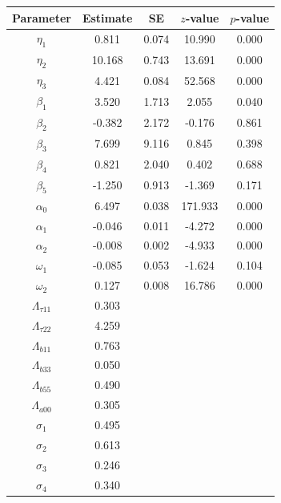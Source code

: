 \begin{table}[ht]
\centering
\begin{tabular}{ccccc}
  \hline
Parameter & Estimate & SE & $z$-value & $p$-value \\ 
  \hline
$\eta_1$ & 0.811 & 0.074 & 10.990 & 0.000 \\ 
  $\eta_2$ & 10.168 & 0.743 & 13.691 & 0.000 \\ 
  $\eta_3$ & 4.421 & 0.084 & 52.568 & 0.000 \\ 
  $\beta_1$ & 3.520 & 1.713 & 2.055 & 0.040 \\ 
  $\beta_2$ & -0.382 & 2.172 & -0.176 & 0.861 \\ 
  $\beta_3$ & 7.699 & 9.116 & 0.845 & 0.398 \\ 
  $\beta_4$ & 0.821 & 2.040 & 0.402 & 0.688 \\ 
  $\beta_5$ & -1.250 & 0.913 & -1.369 & 0.171 \\ 
  $\alpha_0$ & 6.497 & 0.038 & 171.933 & 0.000 \\ 
  $\alpha_1$ & -0.046 & 0.011 & -4.272 & 0.000 \\ 
  $\alpha_2$ & -0.008 & 0.002 & -4.933 & 0.000 \\ 
  $\omega_1$ & -0.085 & 0.053 & -1.624 & 0.104 \\ 
  $\omega_2$ & 0.127 & 0.008 & 16.786 & 0.000 \\ 
  $\Lambda_{\tau11}$ & 0.303 &  &  &  \\ 
  $\Lambda_{\tau22}$ & 4.259 &  &  &  \\ 
  $\Lambda_{b11}$ & 0.763 &  &  &  \\ 
  $\Lambda_{b33}$ & 0.050 &  &  &  \\ 
  $\Lambda_{b55}$ & 0.490 &  &  &  \\ 
  $\Lambda_{a00}$ & 0.305 &  &  &  \\ 
  $\sigma_1$ & 0.495 &  &  &  \\ 
  $\sigma_2$ & 0.613 &  &  &  \\ 
  $\sigma_3$ & 0.246 &  &  &  \\ 
  $\sigma_4$ & 0.340 &  &  &  \\ 
   \hline
\end{tabular}
\end{table}
